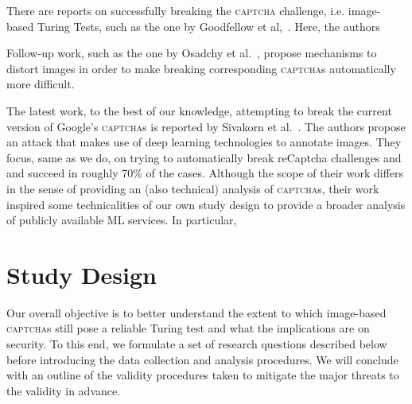 \documentclass[sigconf,review,anonymous]{acmart}
\newcommand{\captcha}{\textsc{captcha}\xspace}
\newcommand{\captchas}{\textsc{captcha}s\xspace}
\begin{document}
There are reports on successfully breaking the \captcha challenge, i.e. image-based Turing Tests, such as the one by Goodfellow et al,~\cite{goodfellow2013multi}. Here, the authors 

Follow-up work, such as the one by Osadchy et al.~\cite{osadchy2017no}, propose mechanisms to distort images in order to make breaking corresponding \captchas automatically more difficult. 


The latest work, to the best of our knowledge, attempting to break the current version of Google's \captchas is reported by Sivakorn et al.~\cite{sivakorn2016robot}. The authors propose an attack that makes use of deep learning technologies to annotate images. They focus, same as we do, on trying to automatically break reCaptcha challenges and and succeed in roughly 70\% of the cases. Although the scope of their work differs in the sense of providing an (also technical) analysis of \captchas, their work inspired some technicalities of our own study design to provide a broader analysis of publicly available ML services. In particular,  




\section{Study Design}
\label{sec:StudyDesign}

Our overall objective is to better understand the extent to which image-based \captchas still pose a reliable Turing test and what the implications are on security. To this end, we formulate a set of research questions described below before introducing the data collection and analysis procedures. We will conclude with an outline of the validity procedures taken to mitigate the major threats to the validity in advance.
\end{document}
